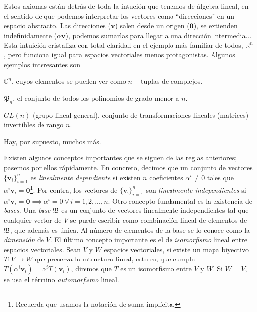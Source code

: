 Estos axiomas están detrás de toda la intución que tenemos de álgebra lineal, en el sentido de que podemos interpretar los vectores como ``direcciones'' en un espacio abstracto. Las direcciones (\(\mathbf{v}\)) salen desde un origen (\(\mathbf{0}\)), se extienden indefinidamente (\(\alpha\mathbf{v}\)), podemos sumarlas para llegar a una dirección intermedia... Esta intuición cristaliza con total claridad en el ejemplo más familiar de todos, \(\mathbb{R}^n\), pero funciona igual para espacios vectoriales menos protagonistas. Algunos ejemplos interesantes son
\begin{myitemize}
    \item \(\mathbb{C}^n\), cuyos elementos se pueden ver como \(n-\)tuplas de complejos.
    \item \(\mathfrak{P}_n\), el conjunto de todos los polinomios de grado menor a \(n\).
    \item \(GL(n)\) (grupo lineal general), conjunto de transformaciones lineales (matrices) invertibles de rango \(n\).
\end{myitemize}
Hay, por supuesto, muchos más. 

Existen algunos conceptos importantes que se siguen de las reglas anteriores; pasemos por ellos rápidamente. En concreto, decimos que un conjunto de vectores \(\{\mathbf{v}_i\}_{i=1}^n\) es \emph{linealmente dependiente} si existen \(
n\) coeficientes \(\alpha^i\neq0\) tales que \(\alpha^i\mathbf{v}_i = \mathbf{0}\)\footnote{Recuerda que usamos la notación de suma implícita.}. Por contra, los vectores de \(\{\mathbf{v}_i\}_{i=1}^n\) son \emph{linealmente independientes} si \(\alpha^i\mathbf{v}_i=\mathbf{0}\implies \alpha^i=0\ \forall\, i=1, 2, ..., n\). Otro concepto fundamental es la existencia de \emph{bases}. Una \emph{base} \(\mathfrak{B}\) es un conjunto de vectores linealmente independientes tal que cualquier vector de \(V\) se puede escribir como combinación lineal de elementos de \(\mathfrak{B}\), que además es única. Al número de elementos de la base se lo conoce como la \emph{dimensión} de \(V\). El último concepto importante es el de \emph{isomorfismo} lineal entre espacios vectoriales. Sean \(V\) y \(W\) espacios vectoriales, si existe un mapa biyectivo \(T:V\rightarrow W\) que preserva la estructura lineal, esto es, que cumple \(T(\alpha^i\mathbf{v}_i) = \alpha^iT(\mathbf{v}_i)\), diremos que \(T\) es un isomorfismo entre \(V\) y \(W\). Si \(W=V\), se usa el término \emph{automorfismo} lineal.

